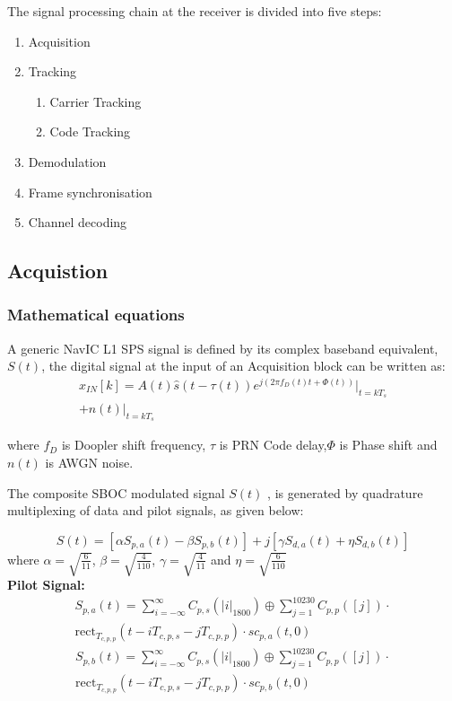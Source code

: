 \documentclass[conference]{IEEEtran}
\begin{document}
The signal processing chain at the receiver is divided into five steps:
\begin{enumerate}
	\item Acquisition
	\item Tracking
	\begin{enumerate}
		\item Carrier Tracking
		\item Code Tracking
	\end{enumerate}
	\item Demodulation
	\item Frame synchronisation
	\item Channel decoding
\end{enumerate}

\subsection{Acquistion}
\subsubsection{Mathematical equations}

A generic NavIC L1 SPS signal is defined by its complex baseband equivalent, 
$S(t)$, the digital signal at the input of an Acquisition block can be written as:
\begin{multline}
	x_{IN}[k]=A(t)\hat s (t-\tau(t))e^{j(2 \pi f_D(t)t+\Phi(t))}\bigg|_{t=kT_s} \\ 
    +n(t)\bigg|_{t=kT_s}
\end{multline}

\noindent where $f_D$ is Doopler shift frequency, $\tau$ is PRN Code delay,$\Phi$ is Phase shift
and $n(t)$ is AWGN noise. 

\noindent The composite SBOC modulated signal $S(t)$ \cite{b1},\cite{b2} is generated by quadrature multiplexing of data and pilot signals, as given below:

\begin{equation}
S(t) = [\alpha S_{p,a}(t) - \beta S_{p,b}(t)] + j[\gamma S_{d,a}(t) + \eta S_{d,b}(t)]
\label{eq:composite_signal}
\end{equation}
\noindent where $\alpha = \sqrt{\frac{6}{11}}$, $\beta = \sqrt{\frac{4}{110}}$, $\gamma = \sqrt{\frac{4}{11}}$ and $\eta = \sqrt{\frac{6}{110}}$ \\

\noindent\textbf{Pilot Signal:}
\begin{multline}
S_{p,a}(t) = \sum_{i=-\infty}^{\infty} C_{p,s}(|i|_{1800}) \oplus \sum_{j=1}^{10230}C_{p,p}([j])\cdot \\
             \text{rect}_{T_{c,p,p}} \left( t - iT_{c,p,s} - jT_{c,p,p}\right) \cdot sc_{p,a}(t, 0)
\label{eq:sp_a}
\end{multline}
\begin{multline}
S_{p,b}(t) =    \sum_{i=-\infty}^{\infty} C_{p,s}(|i|_{1800}) \oplus \sum_{j=1}^{10230}C_{p,p}([j])\cdot \\
    \text{rect}_{T_{c,p,p}} \left( t - iT_{c,p,s} - jT_{c,p,p}\right) \cdot sc_{p,b}(t, 0)
\label{eq:sp_b}
\end{multline}
\end{document}
